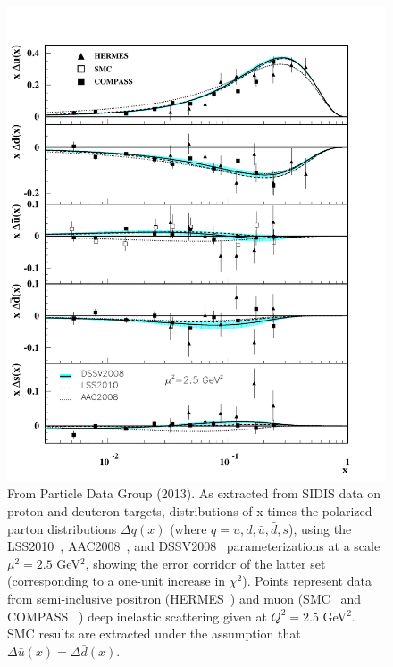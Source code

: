 \begin{figure} [htbp]
  \centering
    \includegraphics[width=0.80\linewidth]{figs_xj/pdg_polq2013.pdf}
  \caption{\label{fig:pdgpolq}  From Particle Data Group (2013).  As extracted from SIDIS data on proton and deuteron targets, distributions of x times the polarized parton distributions $\Delta q(x)$ (where $q = u, d, \bar{u}, \bar{d}, s$),   using the LSS2010~\cite{Leader:2010rb}, AAC2008~\cite{Hirai:2008aj}, and DSSV2008~\cite{DSSV2008}
parameterizations at a scale $\mu^2 = 2.5$ GeV$^2$, showing the error corridor of the latter set (corresponding to a one-unit increase in $\chi^2$). Points represent data from semi-inclusive positron (HERMES~\cite{Airapetian:2004zf}) and muon (SMC~\cite{Adeva:1997qz}
and COMPASS ~\cite{Alekseev:2010ub}) deep inelastic scattering given at $Q^2 = 2.5$ GeV$^2$. SMC
results are extracted under the assumption that $\Delta \bar{u}(x) = \Delta \bar{d}(x)$. }
\end{figure}

